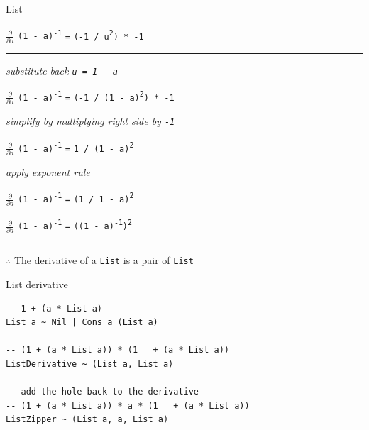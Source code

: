 \begin{frame}{List}

$\frac{\partial}{\partial a}$ {\lstinline{(1 - a)}\textsuperscript{\lstinline{-1}}} \lstinline{=} \lstinline{(-1 / u}\textsuperscript{\lstinline{2}}\lstinline{) * -1}

\par\noindent\rule{\textwidth}{0.4pt}

\emph{\tiny{substitute back \lstinline{u = 1 - a}}}

$\frac{\partial}{\partial a}$ {\lstinline{(1 - a)}\textsuperscript{\lstinline{-1}}} \lstinline{=} \lstinline{(-1 / (1 - a)}\textsuperscript{\lstinline{2}}\lstinline{) * -1}

\emph{\tiny{simplify by multiplying right side by \lstinline{-1}}}

$\frac{\partial}{\partial a}$ {\lstinline{(1 - a)}\textsuperscript{\lstinline{-1}}} \lstinline{=} \lstinline{1 / (1 - a)}\textsuperscript{\lstinline{2}}

\emph{\tiny{apply exponent rule}}

$\frac{\partial}{\partial a}$ {\lstinline{(1 - a)}\textsuperscript{\lstinline{-1}}} \lstinline{=} \lstinline{(1 / 1 - a)}\textsuperscript{\lstinline{2}}

$\frac{\partial}{\partial a}$ {\lstinline{(1 - a)}\textsuperscript{\lstinline{-1}}} \lstinline{=} \lstinline{((1 - a)}\textsuperscript{\lstinline{-1}}\lstinline{)}\textsuperscript{\lstinline{2}}

\par\noindent\rule{\textwidth}{0.4pt}

{$\therefore$} The derivative of a \lstinline{List} is a pair of \lstinline{List}

\end{frame}


\begin{frame}[fragile]
\begin{block}{List derivative}
\begin{lstlisting}[style=haskell]
-- 1 + (a * List a)
List a ~ Nil | Cons a (List a)

-- (1 + (a * List a)) * (1   + (a * List a))
ListDerivative ~ (List a, List a)

-- add the hole back to the derivative
-- (1 + (a * List a)) * a * (1   + (a * List a))
ListZipper ~ (List a, a, List a)
\end{lstlisting}
\end{block}
\end{frame}


